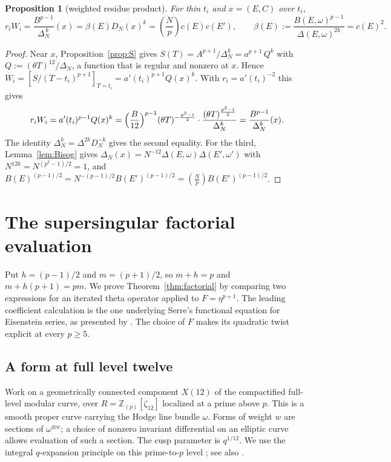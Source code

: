 \documentclass[11pt,a4paper]{article}
\numberwithin{equation}{section}
\newtheorem{proposition}[theorem]{Proposition}
\theoremstyle{definition}
\theoremstyle{remark}
\newcommand{\Z}{\mathbb Z}
\newcommand{\Lp}[1]{\left(\frac{#1}{p}\right)}
\begin{document}
\begin{proposition}[weighted residue product]\label{prop:product}
For thin $t_i$ and $x=(E,C)$ over $t_i$,
\[
r_iW_i=\frac{B^{p-1}}{\Delta_N^{\,k}}(x)=\beta(E)D_N(x)^k
=\Lp{N}c(E)c(E'),\qquad \beta(E):=\frac{B(E,\omega)^{p-1}}{\Delta(E,\omega)^{2k}}=c(E)^2.
\]
\end{proposition}
\begin{proof}
Near $x$, Proposition~\ref{prop:S} gives $S(T)=A^{p+1}/\Delta_N^k=a^{p+1}\,Q^{k}$ with
$Q:=(\theta T)^{12}/\Delta_N$, a function that is regular and nonzero at $x$. Hence
$W_i=[S/(T-t_i)^{p+1}]_{T=t_i}=a'(t_i)^{p+1}Q(x)^k$. With $r_i=a'(t_i)^{-2}$ this gives
\[
r_iW_i=a'(t_i)^{p-1}Q(x)^k=\Bigl(\frac{B}{12}\Bigr)^{p-1}(\theta T)^{-\frac{p^2-1}2}\cdot
\frac{(\theta T)^{\frac{p^2-1}{2}}}{\Delta_N^{k}}=\frac{B^{p-1}}{\Delta_N^k}(x).
\]
The identity $\Delta_N^k=\Delta^{2k}D_N^{-k}$ gives the second equality. For the third,
Lemma~\ref{lem:Bisog} gives $\Delta_N(x)=N^{-12}\Delta(E,\omega)\Delta(E',\omega')$ with
$N^{12k}=N^{(p^2-1)/2}=1$, and $B(E)^{(p-1)/2}=N^{-(p-1)/2}B(E')^{(p-1)/2}=\Lp NB(E')^{(p-1)/2}$.
\end{proof}

\section{The supersingular factorial evaluation}\label{sec:factorial}
Put $h=(p-1)/2$ and $m=(p+1)/2$, so $m+h=p$ and
$m+h(p+1)=pm$. We prove Theorem~\ref{thm:factorial} by comparing two
expressions for an iterated theta operator applied to $F=\eta^{p+1}$.
The leading coefficient calculation is the one underlying Serre's
functional equation for Eisenstein series, as presented by
\citet[\S2.5, Th\'eor\`eme~2, p.~119]{Robert80}. The choice of $F$ makes
its quadratic twist explicit at every $p\ge5$.

\subsection{A form at full level twelve}
Work on a geometrically connected component $X(12)$ of the compactified
full-level modular curve, over $R=\Z_{(p)}[\zeta_{12}]$ localized at a
prime above $p$. This is a smooth proper curve carrying the Hodge line
bundle $\omega$. Forms of weight $w$ are sections of $\omega^{\otimes w}$;
a choice of nonzero invariant differential on an elliptic curve allows
evaluation of such a section. The cusp parameter is $q^{1/12}$.
We use the integral $q$-expansion principle on this prime-to-$p$ level
\citep[\S1.6]{Katz73}; see also \citealp{DR73}.
\end{document}
